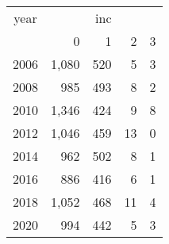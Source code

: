\footnotesize\begin{tabular}[t]{lrrrr}
\toprule
\multicolumn{1}{c}{year} & \multicolumn{4}{c}{inc} \\
\cmidrule(l{3pt}r{3pt}){1-1} \cmidrule(l{3pt}r{3pt}){2-5}
  & 0 & 1 & 2 & 3\\
\midrule
2006 & 1,080 & 520 & 5 & 3\\
2008 & 985 & 493 & 8 & 2\\
2010 & 1,346 & 424 & 9 & 8\\
2012 & 1,046 & 459 & 13 & 0\\
2014 & 962 & 502 & 8 & 1\\
2016 & 886 & 416 & 6 & 1\\
2018 & 1,052 & 468 & 11 & 4\\
2020 & 994 & 442 & 5 & 3\\
\bottomrule
\end{tabular}
